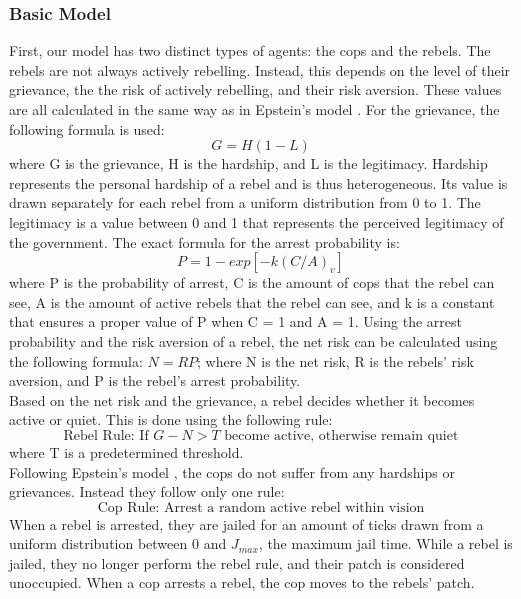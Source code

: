 \documentclass[a4paper,11pt]{article}
\begin{document}
\subsubsection{Basic Model}
First, our model has two distinct types of agents: the cops and the rebels. The rebels are not always actively rebelling. Instead, this depends on the level of their grievance, the the risk of actively rebelling, and their risk aversion. These values are all calculated in the same way as in Epstein's model \cite{epstein2002modeling}. For the grievance, the following formula is used:
\[ G = H(1-L) \]
where G is the grievance, H is the hardship, and L is the legitimacy. Hardship represents the personal hardship of a rebel and is thus heterogeneous. Its value is drawn separately for each rebel from a uniform distribution from 0 to 1. The legitimacy is a value between 0 and 1 that represents the perceived legitimacy of the government. %
The exact formula for the arrest probability is:
\[ P = 1 - exp[-k(C/A)_v] \]
where P is the probability of arrest, C is the amount of cops that the rebel can see, A is the amount of active rebels that the rebel can see, and k is a constant that ensures a proper value of P when C = 1 and A = 1.
Using the arrest probability and the risk aversion of a rebel, the net risk can be calculated using the following formula: $N = RP$; where N is the net risk, R is the rebels' risk aversion, and P is the rebel's arrest probability.\\
Based on the net risk and the grievance, a rebel decides whether it becomes active or quiet. This is done using the following rule:
\[\text{Rebel Rule: If } G - N > T \text{ become active, otherwise remain quiet}\]
where T is a predetermined threshold.\\
Following Epstein's model \cite{epstein2002modeling}, the cops do not suffer from any hardships or grievances. Instead they follow only one rule:
\[\text{Cop Rule: Arrest a random active rebel within vision}\]
When a rebel is arrested, they are jailed for an amount of ticks drawn from a uniform distribution between 0 and $J_{max}$, the maximum jail time. While a rebel is jailed, they no longer perform the rebel rule, and their patch is considered unoccupied. When a cop arrests a rebel, the cop moves to the rebels' patch.
\end{document}
